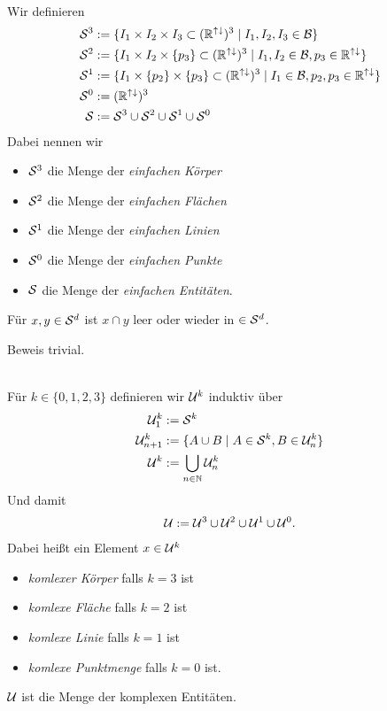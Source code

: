 \begin{dfn}\ \\
    Wir definieren
    \begin{align*}
        \mathcal{S}^3 &:= \{I_1 \times I_2 \times I_3 \subset (\mathbb{R}^{{\uparrow \downarrow}})^3 \mid I_1, I_2, I_3 \in \mathcal{B}\}\\
        \mathcal{S}^2 &:= \{I_1 \times I_2 \times \{p_3\} \subset (\mathbb{R}^{{\uparrow \downarrow}})^3 \mid I_1, I_2 \in \mathcal{B}, p_3 \in \mathbb{R}^{{\uparrow \downarrow}}\}\\
        \mathcal{S}^1 &:= \{I_1 \times \{p_2\} \times \{p_3\} \subset (\mathbb{R}^{{\uparrow \downarrow}})^3 \mid I_1 \in \mathcal{B}, p_2, p_3 \in \mathbb{R}^{{\uparrow \downarrow}}\}\\
        \mathcal{S}^0 &:= (\mathbb{R}^{{\uparrow \downarrow}})^3\\
        \mathcal{S} &:= \mathcal{S}^3 \cup \mathcal{S}^2 \cup \mathcal{S}^1 \cup \mathcal{S}^0
    \end{align*}
    Dabei nennen wir
    \begin{itemize}
        \item $\mathcal{S}^3$ die Menge der \emph{einfachen Körper}
        \item $\mathcal{S}^2$ die Menge der \emph{einfachen Flächen}
        \item $\mathcal{S}^1$ die Menge der \emph{einfachen Linien}
        \item $\mathcal{S}^0$ die Menge der \emph{einfachen Punkte}
        \item $\mathcal{S}$ die Menge der \emph{einfachen Entitäten}.
    \end{itemize}
\end{dfn}

\begin{satz}
    Für $x,y \in \mathcal{S}^d$ ist $x \cap y$ leer oder wieder in $\in \mathcal{S}^d$.
\end{satz}
Beweis trivial.

\begin{dfn}\ \\
    Für $k \in \{0,1,2,3\}$ definieren wir $\mathcal{U}^k$ induktiv über
    \begin{align*}
        \mathcal{U}_1^k &:= \mathcal{S}^k\\
        \mathcal{U}_{n+1}^k &:= \{A \cup B \mid A \in \mathcal{S}^k, B \in \mathcal{U}_n^k\}\\
        \mathcal{U}^k &:= \bigcup_{n \in \mathbb{N}} \mathcal{U}_n^k
    \end{align*}
    Und damit
    \begin{align*}
        \mathcal{U} := \mathcal{U}^3 \cup \mathcal{U}^2 \cup \mathcal{U}^1 \cup \mathcal{U}^0.
    \end{align*}
    Dabei heißt ein Element $x \in \mathcal{U}^k$
    \begin{itemize}
        \item \emph{komlexer Körper} falls $k = 3$ ist
        \item \emph{komlexe Fläche} falls $k = 2$ ist
        \item \emph{komlexe Linie} falls $k = 1$ ist
        \item \emph{komlexe Punktmenge} falls $k = 0$ ist.
    \end{itemize}
    $\mathcal{U}$ ist die Menge der komplexen Entitäten.
\end{dfn}

